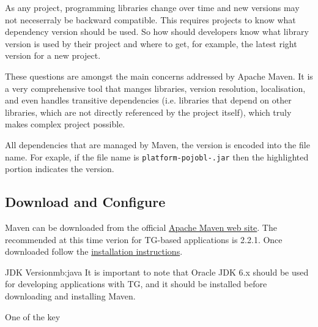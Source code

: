   As any project, programming libraries change over time and new versions may not neceserraly be backward compatible.
  This requires projects to know what dependency version should be used.
  So how should developers know what library version is used by their project and where to get, for example, the latest right version for a new project.

  These questions are amongst the main concerns addressed by Apache Maven.
  It is a very comprehensive tool that manges libraries, version resolution, localisation, and even handles transitive dependencies (i.e. libraries that depend on other libraries, which are not directly referenced by the project itself), which truly makes complex project possible.

  All dependencies that are managed by Maven, the version is encoded into the file name.
  For exaple, if the file name is \texttt{platform-pojobl-.jar} then the highlighted portion \texttt{} indicates the version.

  \subsection*{Download and Configure} 
  Maven can be downloaded from the official \href{http://maven.apache.org/download.html}{Apache Maven web site}.
  The recommended at this time verion for TG-based applications is 2.2.1.
  Once downloaded follow the \href{http://maven.apache.org/download.html#Installation}{installation instructions}.
  
  \begin{notebox}{JDK Version}{mb:java}
    It is important to note that Oracle JDK 6.x should be used for developing applications with TG, and it should be installed before downloading and installing Maven. 
  \end{notebox}
  
  One of the key 

